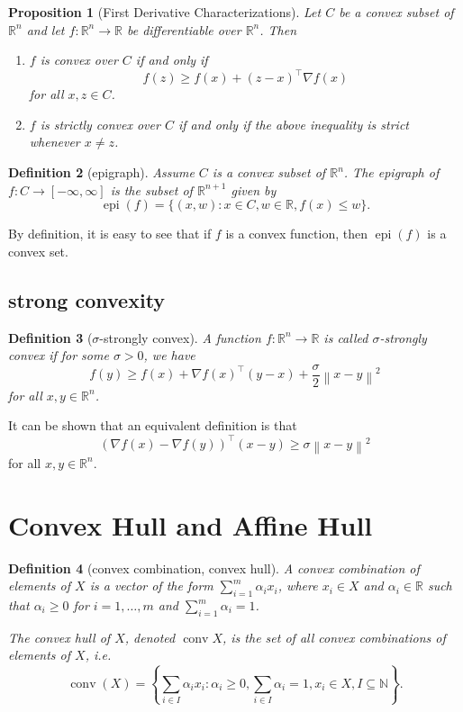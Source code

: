 \documentclass[12pt,a4paper]{report}
\numberwithin{equation}{section}
\theoremstyle{mystyle}
\newtheorem{definition}{Definition}[section]
\newtheorem{proposition}[definition]{Proposition}
\newcommand{\R}{\mathbb{R}}
\newcommand{\N}{\mathbb{N}}
\newcommand{\grad}{\nabla}
\newcommand{\T}{\top}
\newcommand{\conv}{\operatorname{conv}}
\newcommand{\epi}{\operatorname{epi}}
\newcommand{\norm}[1]{\left\lVert #1 \right\rVert}
\begin{document}
	\begin{proposition}[First Derivative Characterizations]
		\label{prop:First Derivative Characterizations}
		Let $C$ be a convex subset of $\R^n$ and let $f:\R^n \to \R$ be differentiable over $\R^n$. Then
		\begin{enumerate}
			\item $f$ is convex over $C$ if and only if
			\begin{equation}
				f(z)\geq f(x)+(z-x)^\T \grad f(x)
			\end{equation}
			for all $x,z\in C$.
			\item $f$ is strictly convex over $C$ if and only if the above inequality is strict whenever $x\neq z$.
		\end{enumerate}
	\end{proposition}

	\begin{definition}[epigraph]
		Assume $C$ is a convex subset of $\R^n$. The \emph{epigraph} of $f:C\to [-\infty,\infty]$ is the subset of $\R^{n+1}$ given by
		$$
		\epi(f)=\{(x,w): x\in C, w\in \R, f(x)\leq w\}.
		$$
	\end{definition}
	By definition, it is easy to see that if $f$ is a convex function, then $\epi(f)$ is a convex set.
	
	\subsection{strong convexity}
	\begin{definition}[$\sigma$-strongly convex]
		A function $f:\R^n \to \R$ is called \emph{$\sigma$-strongly convex} if for some $\sigma>0$, we have
		\begin{equation}
			f(y)\geq f(x)+\grad f(x)^\T (y-x)+\frac{\sigma}{2}\norm{x-y}^2
		\end{equation}
		for all $x,y\in \R^n$.
	\end{definition}
	It can be shown that an equivalent definition is that
	\begin{equation}
		(\grad f(x)-\grad f(y))^\T(x-y)\geq \sigma \norm{x-y}^2
	\end{equation}
	for all $x,y\in \R^n$.
	
	
	\section{Convex Hull and Affine Hull}
	\begin{definition}[convex combination, convex hull]
		A \emph{convex combination} of elements of $X$ is a vector of the form $\sum_{i=1}^m \alpha_i x_i$, where $x_i\in X$ and $\alpha_i\in \R$ such that $\alpha_i\geq 0$ for $i=1,\dots,m$ and $\sum_{i=1}^m \alpha_i =1$.
		
		The \emph{convex hull} of $X$, denoted $\conv{X}$, is the set of all convex combinations of elements of $X$, i.e.
		\begin{equation}
			\conv(X) = \left\{\sum_{i\in I} \alpha_i x_i: \alpha_i\geq 0, \sum_{i\in I}\alpha_i=1, x_i\in X, I\subseteq \N \right\}.
		\end{equation} 
	\end{definition}
	
\end{document}
